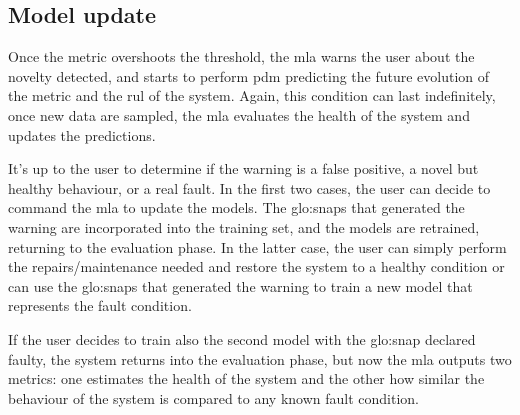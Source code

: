 \subsection{Model update}
Once the metric overshoots the threshold, the \gls{mla} warns the user about the novelty detected, and starts to perform \gls{pdm} predicting the future evolution of the metric and the \gls{rul} of the system. 
Again, this condition can last indefinitely, once new data are sampled, the \gls{mla} evaluates the health of the system and updates the predictions.

It's up to the user to determine if the warning is a false positive, a novel but healthy behaviour, or a real fault. In the first two cases, the user can decide to command the \gls{mla} to update the models. The \gls{glo:snap}s that generated the warning are incorporated into the training set, and the models are retrained, returning to the evaluation phase. In the latter case, the user can simply perform the repairs/maintenance needed and restore the system to a healthy condition or can use the \gls{glo:snap}s that generated the warning to train a new model that represents the fault condition.

If the user decides to train also the second model with the \gls{glo:snap} declared faulty, the system returns into the evaluation phase, but now the \gls{mla} outputs two metrics: one estimates the health of the system and the other how similar the behaviour of the system is compared to any known fault condition.

